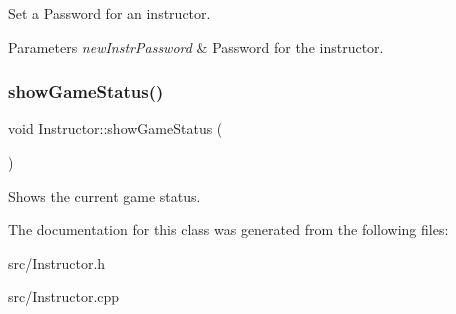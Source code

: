 Set a Password for an instructor. 
\begin{DoxyParams}{Parameters}
{\em new\+Instr\+Password} & Password for the instructor. \\
\hline
\end{DoxyParams}
\mbox{\label{classInstructor_ab92e047829e5977967071f812368b8b7}} 
\subsubsection{\texorpdfstring{show\+Game\+Status()}{showGameStatus()}}
{\footnotesize\ttfamily void Instructor\+::show\+Game\+Status (\begin{DoxyParamCaption}{ }\end{DoxyParamCaption})}

Shows the current game status. 

The documentation for this class was generated from the following files\+:\begin{DoxyCompactItemize}
\item 
src/Instructor.\+h\item 
src/Instructor.\+cpp\end{DoxyCompactItemize}
